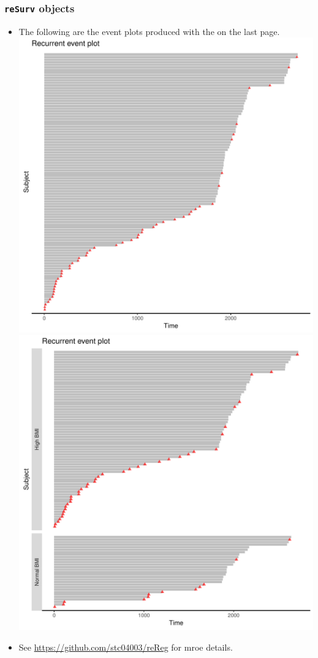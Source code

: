 \documentclass[10pt]{beamer}\usepackage[]{graphicx}\usepackage[]{color}
\begin{document}
\begin{frame}[fragile]
  \frametitle{\texttt{reSurv} objects}
  \begin{itemize}
  \item The following are the event plots produced with the on the last page.
    \centering
    \includegraphics[scale = .28]{tab1-1-3-2}\hspace{.5cm}
    \includegraphics[scale = .28]{tab1-1-3-3}
  \item See \url{https://github.com/stc04003/reReg} for mroe details.
\end{itemize}
\end{frame}
\end{document}
